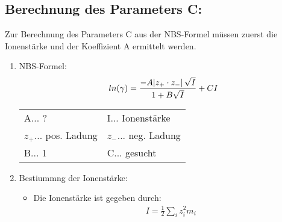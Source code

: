 \subsection*{Berechnung des Parameters C:}

Zur Berechnung des Parameters C aus der NBS-Formel müssen zuerst die Ionenstärke und der Koeffizient A ermittelt werden.
\begin{enumerate}
	\item NBS-Formel:
	      \begin{align*}
		      ln(\gamma) = \frac{-A \abs{z_+ \cdot z_-} \sqrt{I}} {1 + B \sqrt{I}} + CI
	      \end{align*}
	      \begin{table}[H]
		      \centering

		      \begin{tabular}{ll}
			      A... ?               & I... Ionenstärke     \\
			      $z_+$... pos. Ladung & $z_-$... neg. Ladung \\
			      B... 1               & C... gesucht         \\
		      \end{tabular}
	      \end{table}
	\item Bestiummng der Ionenstärke:
	      \begin{itemize}
		      \item Die Ionenstärke ist gegeben durch:
		            \begin{align*}
			            I = \frac{1}{2} \sum\limits_{i} z_i^2m_i
		            \end{align*}
		            \begin{table}[H]
			            \centering


\end{table}
\end{itemize}
\end{enumerate}
